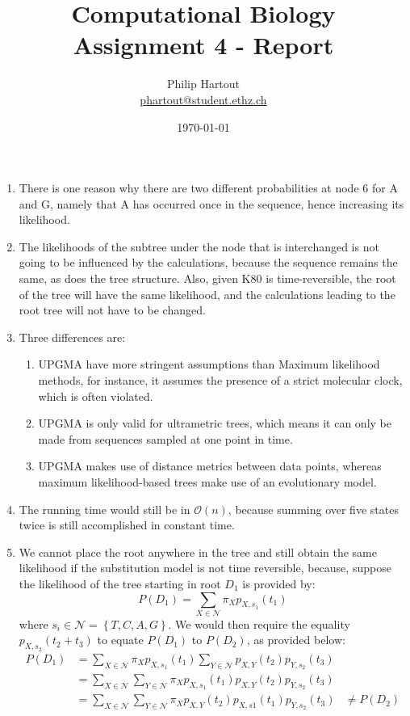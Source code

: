 \documentclass[a4paper,10pt,twoside]{article}
\title{Computational Biology \\ Assignment 4 - Report}
\author{Philip Hartout \\ \url{phartout@student.ethz.ch}}
\date{\today}
\begin{document}
\maketitle

\begin{enumerate}
   \item There is one reason why there are two different probabilities at node 6 for A and G, namely that A has occurred once in the sequence, hence increasing its likelihood.
   \item The likelihoods of the subtree under the node that is interchanged is not going to be influenced by the calculations, because the sequence remains the same, as does the tree structure. Also, given K80 is time-reversible, the root of the tree will have the same likelihood, and the calculations leading to the root tree will not have to be changed.
   \item Three differences are:
   \begin{enumerate}
       \item UPGMA have more stringent assumptions than Maximum likelihood methods, for instance, it assumes the presence of a strict molecular clock, which is often violated.
       \item UPGMA is only valid for ultrametric trees, which means it can only be made from sequences sampled at one point in time.
       \item UPGMA makes use of distance metrics between data points, whereas maximum likelihood-based trees make use of an evolutionary model.
   \end{enumerate}
   \item The running time would still be in $\mathcal{O}(n)$, because summing over five states twice is still accomplished in constant time.
   \item We cannot place the root anywhere in the tree and still obtain the same likelihood if the substitution model is not time reversible, because, suppose the likelihood of the tree starting in root $D_1$ is provided by:
   \begin{equation*}
        P(D_1) = \sum_{X\in \mathcal{N}} \pi_{X}p_{X,s_1}(t_1)
   \end{equation*}
   where $s_i\in \mathcal{N}=\left\{T,C,A,G\right\}$.
   We would then require the equality $p_{X,s_2}(t_2+t_3)$ to equate $P(D_1)$ to $P(D_2)$, as provided below:
   \begin{align*}
       P(D_1) &= \sum_{X\in \mathcal{N}} \pi_{X}p_{X,s_1}(t_1) \sum_{Y\in \mathcal{N}} p_{X,Y}(t_2)p_{Y,s_2}(t_3) \\
       &= \sum_{X\in \mathcal{N}}\sum_{Y\in \mathcal{N}}\pi_{X}p_{X,s_1}(t_1)p_{X,Y}(t_2)p_{Y, s_2}(t_3)\\
       &= \sum_{X\in \mathcal{N}}\sum_{Y\in \mathcal{N}}\pi_{X}p_{X,Y}(t_2)p_{X,s1}(t_1)p_{Y, s_2}(t_3)
       & \neq P(D_2)
   \end{align*}

\end{enumerate}
\end{document}
